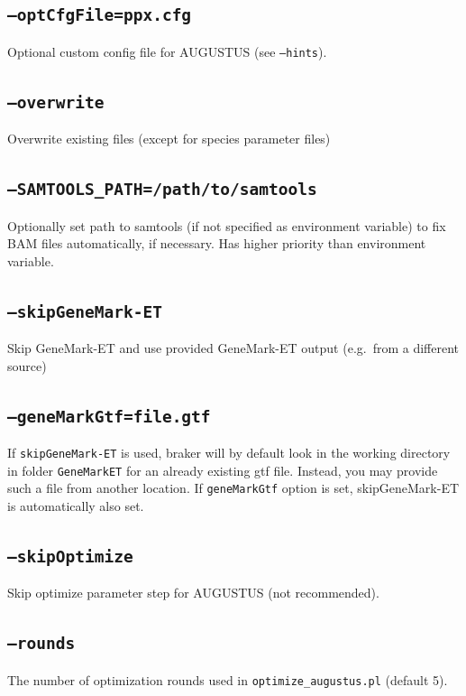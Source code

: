\documentclass[a4paper,10pt]{report}
\begin{document}
\subsection{\texttt{--optCfgFile=ppx.cfg}}                 Optional custom config file for AUGUSTUS (see \texttt{--hints}).
\subsection{\texttt{--overwrite}}                          Overwrite existing files (except for species parameter files)
\subsection{\texttt{--SAMTOOLS\_PATH=/path/to/samtools}}            Optionally set path to samtools (if not specified as environment 
variable) to fix BAM files automatically, if necessary. Has higher     
                                         priority than environment variable.
\subsection{\texttt{--skipGeneMark-ET}}                    Skip GeneMark-ET and use provided GeneMark-ET output (e.g.~from a
                                         different source) 
\subsection{\texttt{--geneMarkGtf=file.gtf}}               If \texttt{skipGeneMark-ET} is used, braker will by default look in the 
                                         working directory in folder \texttt{GeneMarkET} for an already existing gtf
                                         file. Instead, you may provide such a file from another location.
                                         If \texttt{geneMarkGtf} option is set, skipGeneMark-ET is automatically also set.
\subsection{\texttt{--skipOptimize}}                       Skip optimize parameter step for AUGUSTUS (not recommended).
\subsection{\texttt{--rounds}}                             The number of optimization rounds used in \texttt{optimize\_augustus.pl} (default 5).
\end{document}
